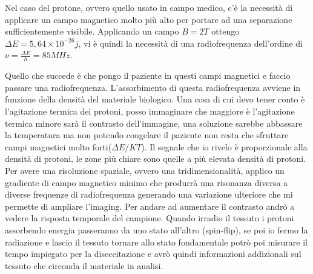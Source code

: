 Nel caso del protone, ovvero quello usato in campo medico, c'è la necessità di applicare un campo magnetico molto più alto per portare ad una separazione sufficientemente visibile. 
Applicando un campo $B=2T$ ottengo $\Delta E=5,64\times10^{-26}j$, vi è quindi la necessità di una radiofrequenza dell'ordine di $\nu =\frac{\Delta E}{h}=85MHz$.

Quello che succede è che pongo il paziente in questi campi magnetici e faccio passare una radiofrequenza. 
L'assorbimento di questa radiofrequenza avviene in funzione della densità del materiale biologico.
Una cosa di cui devo tener conto è l'agitazione termica dei protoni, posso immaginare che maggiore è l'agitazione termica minore sarà il contrasto dell'immagine, una soluzione sarebbe abbassare la temperatura ma non potendo congelare il paziente non resta che sfruttare campi magnetici molto forti($\Delta E/KT$).
Il segnale che io rivelo è proporzionale alla densità di protoni, le zone più chiare sono quelle a più elevata densità di protoni.
Per avere una risoluzione spaziale, ovvero una tridimensionalità, applico un gradiente di campo magnetico minimo che produrrà una risonanza diversa a diverse frequenze di radiofrequenza generando una variazione ulteriore che mi permette di ampliare l'imaging.
Per andare ad aumentare il contrasto andrò a vedere la risposta temporale del campione.
Quando irradio il tessuto i protoni assorbendo energia passeranno da uno stato all'altro (spin-flip), se poi io fermo la radiazione e lascio il tessuto tornare allo stato fondamentale potrò poi misurare il tempo impiegato per la diseccitazione e avrò quindi informazioni addizionali sul tessuto che circonda il materiale in analisi.

